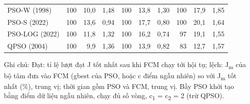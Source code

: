 \begin{table}[htbp]
\begin{tabular}{@{}lrrrrrrrrr@{}}
PSO-W (1998) & 100 & 10,0 & 1,48 & 100 & 13,8 & 1,30 & 100 & 17,9 & 1,85 \\
PSO-S (2022) & 100 & 13,6 & 0,94 & 100 & 17,7 & 0,80 & 100 & 20,1 & 1,64 \\
PSO-LOG (2022) & 100 & 11,8 & 1,32 & 100 & 16,2 & 0,74 & 97 & 19,1 & 1,55 \\
QPSO (2004) & 100 & 9,9 & 1,36 & 100 & 13,9 & 0,82 & 83 & 12,7 & 1,57 \\
\bottomrule
\end{tabular}
\par\smallskip\parbox{\linewidth}{\scriptsize Ghi chú: Đạt: tỉ lệ lượt đạt J tốt nhất sau khi FCM chạy tới hội tụ; lệch: J\textsubscript{m} của bộ tâm đưa vào FCM (gbest của PSO, hoặc c điểm ngẫu nhiên) so với J\textsubscript{m} tốt nhất (\%), trung vị; thời gian gồm PSO và FCM, trung vị. Bầy PSO khởi tạo bằng điểm dữ liệu ngẫu nhiên, chạy đủ số vòng, c\textsubscript{1} = c\textsubscript{2} = 2 (trừ QPSO).}
\end{table}
